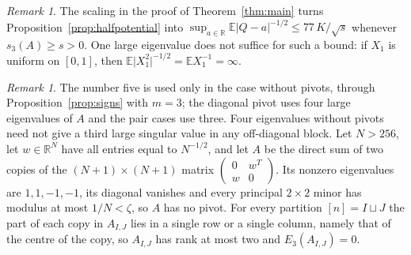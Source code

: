 \documentclass[11pt]{amsart}
\numberwithin{equation}{section}
\theoremstyle{definition}
\theoremstyle{remark}
\newtheorem{remark}[theorem]{Remark}
\newcommand{\R}{\mathbb R}
\newcommand{\E}{\mathbb E}
\newcommand{\1}{\mathbf 1}
\newcommand{\abs}[1]{\lvert #1\rvert}
\begin{document}
\begin{remark}
The scaling in the proof of Theorem~\ref{thm:main} turns Proposition~\ref{prop:halfpotential} into $\sup_{a\in\R}\E\abs{Q-a}^{-1/2}\le77\,K/\sqrt s$ whenever $s_3(A)\ge s>0$. One large eigenvalue does not suffice for such a bound: if $X_1$ is uniform on $[0,1]$, then $\E\abs{X_1^2}^{-1/2}=\E X_1^{-1}=\infty$.
\end{remark}

\begin{remark}
The number five is used only in the case without pivots, through Proposition~\ref{prop:signs} with $m=3$; the diagonal pivot uses four large eigenvalues of $A$ and the pair cases use three. Four eigenvalues without pivots need not give a third large singular value in any off-diagonal block. Let $N>256$, let $w\in\R^N$ have all entries equal to $N^{-1/2}$, and let $A$ be the direct sum of two copies of the $(N+1)\times(N+1)$ matrix $\begin{pmatrix}0&w^T\\w&0\end{pmatrix}$. Its nonzero eigenvalues are $1,1,-1,-1$, its diagonal vanishes and every principal $2\times2$ minor has modulus at most $1/N<\zeta$, so $A$ has no pivot. For every partition $[n]=I\sqcup J$ the part of each copy in $A_{I,J}$ lies in a single row or a single column, namely that of the centre of the copy, so $A_{I,J}$ has rank at most two and $E_3(A_{I,J})=0$.
\end{remark}
\end{document}
